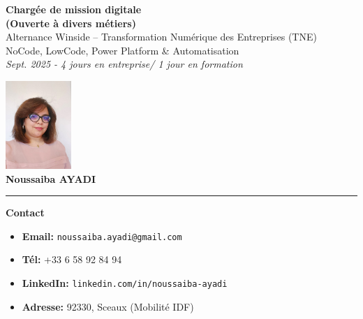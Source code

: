 \documentclass[11pt,a4paper]{article}
\newcommand{\cvsection}[1]{%
  \vspace{0pt}
  \noindent
  \textcolor{accentcolor}{\rule{2cm}{1.5pt}}\hspace{0.5em}
  {\large\bfseries\color{accentcolor}#1}
  \vspace{0.5em}
  \par\nobreak
}
\begin{document}
\begin{minipage}[t]{0.8\textwidth}
    \vspace*{0.8cm} %
    {\Large\bfseries\color{accentcolor} Chargée de mission digitale\\(Ouverte à divers métiers)} \\ \hfill Alternance Winside – Transformation Numérique des Entreprises (TNE)\\ NoCode, LowCode, Power Platform \& Automatisation\\[0.4em]
    {\small\itshape Sept. 2025 - 4 jours en entreprise/
1 jour en formation}
\end{minipage}%
\hfill
\begin{minipage}[t]{0.2\textwidth}
    \raggedleft
    \vspace*{-0cm} %
    \includegraphics[width=2.5cm]{nouss.jpg}\\[0.5em]
    {\normalsize\bfseries\color{accentcolor}Noussaiba AYADI}
\end{minipage}

\vspace*{0.0cm}  %
\begin{minipage}[t]{0.6\textwidth}
  \cvsection{Contact}
  {\large
  \begin{itemize}
    \item \textbf{Email:} \texttt{noussaiba.ayadi@gmail.com}
    \item \textbf{Tél:} +33 6 58 92 84 94
    \item \textbf{LinkedIn:} \texttt{linkedin.com/in/noussaiba-ayadi}
    \item \textbf{Adresse:} 92330, Sceaux (Mobilité IDF)
  \end{itemize}
  }
\end{minipage}
\end{document}
